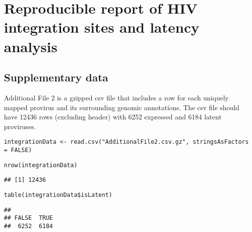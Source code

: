 \documentclass[../../sherrill-Mix_thesis.tex]{subfiles}
\makeatletter
\newenvironment{kframe}{%
 \def\at@end@of@kframe{}%
 \ifinner\ifhmode%
  \def\at@end@of@kframe{\end{minipage}}%
  \begin{minipage}{\columnwidth}%
 \fi\fi%
 \def\FrameCommand##1{\hskip\@totalleftmargin \hskip-\fboxsep
 \colorbox{shadecolor}{##1}\hskip-\fboxsep
     \hskip-\linewidth \hskip-\@totalleftmargin \hskip\columnwidth}%
 \MakeFramed {\advance\hsize-\width
   \@totalleftmargin\z@ \linewidth\hsize
   \@setminipage}}%
 {\par\unskip\endMakeFramed%
 \at@end@of@kframe}
\newenvironment{knitrout}{}{} %
\makeatother
\begin{document}
\graphicspath{{./}{appendices/latencyReport/}}
\chapter{Reproducible report of HIV integration sites and latency analysis}
\label{appLatencyReport}



\section{Supplementary data}
Additional File 2 is a gzipped csv file that includes a row for each uniquely mapped provirus and its surrounding genomic annotations. The csv file should have 12436 rows (excluding header) with 6252 expressed and 6184 latent proviruses.
\begin{knitrout}
\color{fgcolor}\begin{kframe}
\begin{lstlisting}[basicstyle=\ttfamily,breaklines=true]
integrationData <- read.csv("AdditionalFile2.csv.gz", stringsAsFactors = FALSE)\end{lstlisting}
\begin{lstlisting}[basicstyle=\ttfamily,breaklines=true]
nrow(integrationData)\end{lstlisting}
\begin{lstlisting}[basicstyle=\ttfamily,breaklines=true]
## [1] 12436
\end{lstlisting}
\begin{lstlisting}[basicstyle=\ttfamily,breaklines=true]
table(integrationData$isLatent)\end{lstlisting}
\begin{lstlisting}[basicstyle=\ttfamily,breaklines=true]
## 
## FALSE  TRUE 
##  6252  6184
\end{lstlisting}
\end{kframe}
\end{knitrout}
\end{document}
